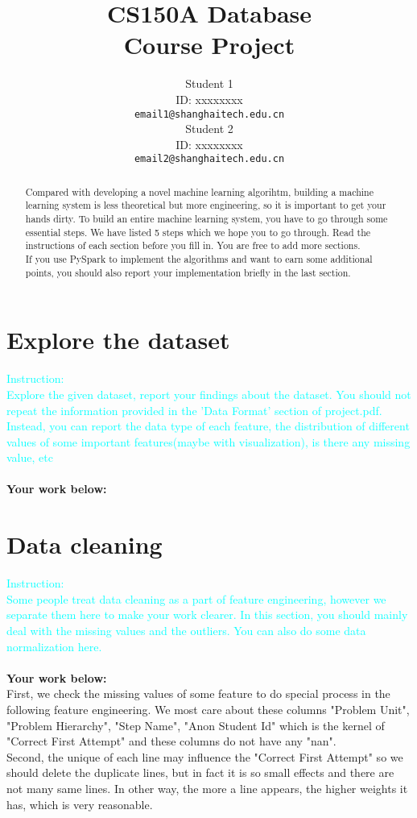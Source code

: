 \documentclass{article}
\title{CS150A Database \\Course Project}
\author{
  Student 1\\
  ID: xxxxxxxx\\
  \texttt{email1@shanghaitech.edu.cn} \\
   \And
  Student 2\\
  ID: xxxxxxxx\\
  \texttt{email2@shanghaitech.edu.cn}
}
\begin{document}

\maketitle

\begin{abstract}

Compared with developing a novel machine learning algorihtm, building a machine learning system is less theoretical but more engineering, so it is important to get your hands dirty. To build an entire machine learning system, you have to go through some essential steps. We have listed 5 steps which we hope you to go through. Read the instructions of each section before you fill in. You are free to add more sections. \\
If you use PySpark to implement the algorithms and want to earn some additional points, you should also report your implementation briefly in the last section.
\end{abstract}

\section{Explore the dataset}
\textcolor{cyan}{Instruction: \\
Explore the given dataset, report your findings about the dataset. You should not repeat the information provided in the 'Data Format' section of project.pdf. Instead, you can report the data type of each feature, the distribution of different values of some important features(maybe with visualization), is there any missing value, etc}\\\\
\textbf{Your work below:}\\
\section{Data cleaning}
\textcolor{cyan}{Instruction: \\
Some people treat data cleaning as a part of feature engineering, however we separate them here to make your work clearer. In this section, you should mainly deal with the missing values and the outliers. You can also do some data normalization here.}\\\\
\textbf{Your work below:}\\
First, we check the missing values of some feature to do special process in the following feature engineering. We most care about these columns "Problem Unit", "Problem Hierarchy", "Step Name", "Anon Student Id" which is the kernel of "Correct First Attempt" and these columns do not have any "nan".\\
Second, the unique of each line may influence the "Correct First Attempt" so we should delete the duplicate lines, but in fact it is so small effects and there are not many same lines. In other way, the more a line appears, the higher weights it has, which is very reasonable.\\
\end{document}
